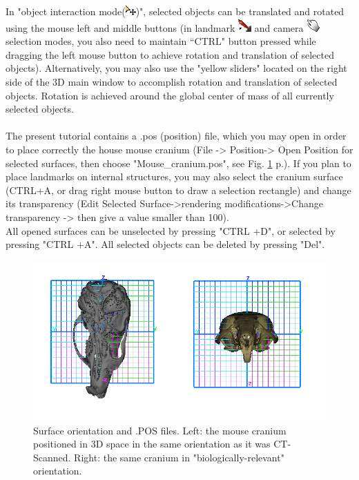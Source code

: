 \documentclass[12pt, a4paper]{book}
\begin{document}
In "object interaction mode(\includegraphics[scale=0.7]{../images/04/move_mode.png})", selected objects can be translated and rotated using the mouse left and middle buttons (in landmark \includegraphics[scale=0.7]{../images/04/Landmarks2.png} and camera  \includegraphics[scale=0.7]{../images/04/camera_mode.png} selection modes, you also need to maintain ``CTRL" button pressed while dragging the left mouse button to achieve rotation and translation of selected objects). Alternatively, you may also use the "yellow sliders" located on the right side of the 3D main window to accomplish rotation and translation of selected objects. Rotation is achieved around the global center of mass of all currently selected objects.\\
\\
The present tutorial contains a .pos (position) file, which you may open in order to place correctly the house
mouse cranium (File -> Position-> Open Position for selected surfaces, then choose "Mouse\_cranium.pos", see Fig. \ref{orientation} p.\pageref{orientation}). If you plan to place landmarks
on internal structures, you may also select the cranium surface (CTRL+A, or drag right mouse button to draw a selection rectangle) and change its transparency (Edit Selected Surface->rendering modifications->Change transparency -> then give a value smaller than 100).\\
All opened surfaces can be unselected by pressing "CTRL +D", or selected by pressing "CTRL +A". All selected objects can be deleted by pressing "Del".

\begin{figure}
  \centering
  \includegraphics[scale=0.4]{pos.png} 
	\caption{Surface orientation and .POS files.  Left: the mouse cranium positioned in 3D space in the same orientation as it was CT-Scanned. Right: the same cranium in "biologically-relevant" orientation.}
\label{orientation}
 
\end{figure}
\end{document}
